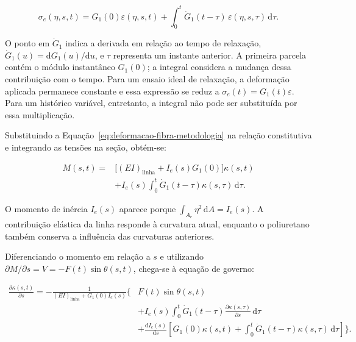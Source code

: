 \documentclass[arial,centeredequations,english,brazilian,oneside,section=TITLE]{ifes8}
\begin{document}
\begin{equation}
  \sigma_e(\eta,s,t)=G_1(0)\varepsilon(\eta,s,t)
  +\int_0^t \dot G_1(t-\tau)\,
    \varepsilon(\eta,s,\tau)\,\mathrm{d}\tau.
  \label{eq:constitutiva-linear-historico}
\end{equation}

O ponto em $\dot G_1$ indica a derivada em relação ao tempo de relaxação,
$\dot G_1(u)=\mathrm{d}G_1(u)/\mathrm{d}u$, e $\tau$ representa um instante
anterior. A primeira parcela contém o módulo instantâneo $G_1(0)$; a integral
considera a mudança dessa contribuição com o tempo. Para um ensaio ideal de
relaxação, a deformação aplicada permanece constante e essa expressão se reduz
a $\sigma_e(t)=G_1(t)\varepsilon$. Para um histórico variável, entretanto, a
integral não pode ser substituída por essa multiplicação.

Substituindo a Equação~\eqref{eq:deformacao-fibra-metodologia} na relação
constitutiva e integrando as tensões na seção, obtém-se:

\begin{equation}
  \begin{aligned}
    M(s,t)={}&\bigl[(EI)_{\mathrm{linha}}+I_e(s)G_1(0)\bigr]\kappa(s,t)\\
      &+I_e(s)\int_0^t
        \dot G_1(t-\tau)\kappa(s,\tau)\,\mathrm{d}\tau.
  \end{aligned}
  \label{eq:momento-curvatura-linear-tempo}
\end{equation}

O momento de inércia $I_e(s)$ aparece porque
$\int_{A_e}\eta^2\,\mathrm{d}A=I_e(s)$. A contribuição elástica da linha
responde à curvatura atual, enquanto o poliuretano também conserva a influência
das curvaturas anteriores.

Diferenciando o momento em relação a $s$ e utilizando
$\partial M/\partial s=V=-F(t)\sin\theta(s,t)$, chega-se à equação de governo:

\begin{equation}
  \begin{aligned}
    \frac{\partial\kappa(s,t)}{\partial s}
    =-\frac{1}{(EI)_{\mathrm{linha}}+G_1(0)I_e(s)}
    \Biggl\{&F(t)\sin\theta(s,t)\\
      &+I_e(s)\int_0^t \dot G_1(t-\tau)
        \frac{\partial\kappa(s,\tau)}{\partial s}\,\mathrm{d}\tau\\
      &+\frac{\mathrm{d}I_e(s)}{\mathrm{d}s}
        \left[G_1(0)\kappa(s,t)
        +\int_0^t\dot G_1(t-\tau)\kappa(s,\tau)\,\mathrm{d}\tau\right]
    \Biggr\}.
  \end{aligned}
  \label{eq:governo-curvatura-linear-tempo}
\end{equation}
\end{document}
